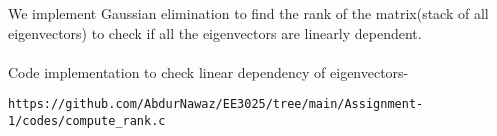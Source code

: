 \documentclass[journal,12pt,twocolumn]{IEEEtran}
\begin{document}
We implement Gaussian elimination to find the rank of the matrix(stack of all eigenvectors) to check if all the eigenvectors are linearly dependent.
\\
\\
Code implementation to check linear dependency of eigenvectors-
\begin{lstlisting}
https://github.com/AbdurNawaz/EE3025/tree/main/Assignment-1/codes/compute_rank.c
\end{lstlisting}


\end{document}
